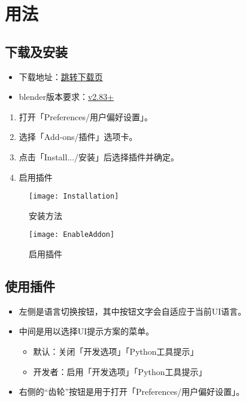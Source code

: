 \documentclass{../../PublicResources/DocClass}
\begin{document}
    \section{用法}

    \subsection{下载及安装}
    \begin{itemize}
        \item 下载地址：\href{https://github.com/Mister-Kin/ToggleLanguage/releases/latest}{跳转下载页}
        \item blender版本要求：\href{https://www.blender.org/download/}{v2.83+}
    \end{itemize}

    \begin{enumerate}
        \item 打开「Preferences/用户偏好设置」。
        \item 选择「Add-ons/插件」选项卡。
        \item 点击「Install.../安装」后选择插件并确定。
        \item 启用插件
    \end{enumerate}

    \begin{figure}[htbp]
        \begin{minipage}[t]{0.45\textwidth}
            \texttt{[image: Installation]}
            \caption*{安装方法}
        \end{minipage}
        \qquad
        \begin{minipage}[t]{0.45\textwidth}
            \texttt{[image: EnableAddon]}
            \caption*{启用插件}
        \end{minipage}
    \end{figure}

    \subsection{使用插件}
    \hypertarget{UsingAddon}{}
    \begin{itemize}
        \item 左侧是语言切换按钮，其中按钮文字会自适应于当前UI语言。
        \item 中间是用以选择UI提示方案的菜单。
        \begin{itemize}
            \item 默认：关闭「开发选项」「Python工具提示」
            \item 开发者：启用「开发选项」「Python工具提示」
        \end{itemize}
        \item 右侧的“齿轮”按钮是用于打开「Preferences/用户偏好设置」。
    \end{itemize}
\end{document}
